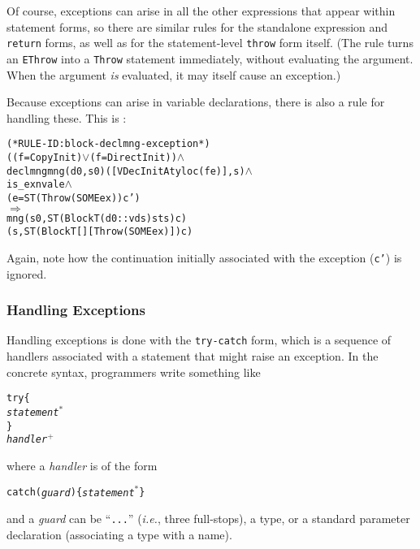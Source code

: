 \documentclass[11pt]{article}
\newcommand{\ie}{\emph{i.e.}}
\begin{document}
Of course, exceptions can arise in all the other expressions that
appear within statement forms, so there are similar rules for the
standalone expression and \texttt{return} forms, as well as for the
statement-level \texttt{throw} form itself.  (The rule
 turns an \texttt{EThrow} into a
\texttt{Throw} statement immediately, without evaluating the argument.
When the argument \emph{is} evaluated, it may itself cause an
exception.)

Because exceptions can arise in variable declarations, there is also a
rule for handling these.  This is :
\begin{center}
\begin{minipage}{\textwidth}
%
\begin{alltt}
(* RULE-ID: block-declmng-exception *)
     ((f = CopyInit) \(\lor\) (f = DirectInit)) \(\land\)
     declmng mng (d0, s0) ([VDecInitA ty loc (f e)], s) \(\land\)
     is_exnval e \(\land\)
     (e = ST (Throw (SOME ex)) c')
   \(\Rightarrow\)
     mng (s0, ST (Block T (d0 :: vds) sts) c)
         (s, ST (Block T [] [Throw (SOME ex)]) c)
\end{alltt}
\end{minipage}
\end{center}
Again, note how the continuation initially associated with the
exception (\texttt{c'}) is ignored.


\subsubsection{Handling Exceptions}

Handling exceptions is done with the \texttt{try-catch} form, which is a
sequence of handlers associated with a statement that might raise an
exception.  In the concrete syntax, programmers write something like
\newcommand{\suplus}{\ensuremath{^+}}
\newcommand{\sustar}{\ensuremath{^*}}
\begin{alltt}
   try \{
     \emph{statement}\sustar
   \}
   \emph{handler}\suplus
\end{alltt}
where a \emph{handler} is of the form
\begin{alltt}
   catch (\emph{guard}) \{ \emph{statement}\sustar \}
\end{alltt}
and a \emph{guard} can be ``\texttt{...}'' (\ie, three full-stops), a
type, or a standard parameter declaration (associating a type with a
name).
\end{document}
